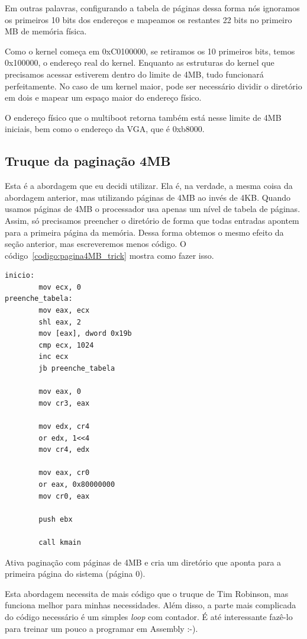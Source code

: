 \documentclass{article}
\begin{document}
Em outras palavras, configurando a tabela de páginas dessa forma nós ignoramos
os primeiros 10 bits dos endereços e mapeamos os restantes 22 bits no primeiro
MB de memória física.

Como o kernel começa em 0xC0100000, se retiramos os 10 primeiros bits, temos
0x100000, o endereço real do kernel. Enquanto as estruturas do kernel que
precisamos acessar estiverem dentro do limite de 4MB, tudo funcionará
perfeitamente. No caso de um kernel maior, pode ser necessário dividir o
diretório em dois e mapear um espaço maior do endereço físico.

O endereço físico que o multiboot retorna também está nesse limite de 4MB
iniciais, bem como o endereço da VGA, que é 0xb8000.

\subsection{Truque da paginação 4MB}
\label{subsec:paginacao_4MB}
Esta é a abordagem que eu decidi utilizar. Ela é, na verdade, a mesma coisa da
abordagem anterior, mas utilizando páginas de 4MB ao invés de 4KB. Quando usamos
páginas de 4MB o processador usa apenas um nível de tabela de páginas. Assim, só
precisamos preencher o diretório de forma que todas entradas apontem para a
primeira página da memória. Dessa forma obtemos o mesmo efeito da seção
anterior, mas escreveremos menos código. O código~\ref{codigo:pagina4MB_trick}
mostra como fazer isso.

\begin{codigo}
\begin{verbatim}
inicio:
        mov ecx, 0
preenche_tabela:
        mov eax, ecx
        shl eax, 2
        mov [eax], dword 0x19b
        cmp ecx, 1024
        inc ecx
        jb preenche_tabela

        mov eax, 0
        mov cr3, eax

        mov edx, cr4
        or edx, 1<<4
        mov cr4, edx

        mov eax, cr0
        or eax, 0x80000000
        mov cr0, eax

        push ebx 

        call kmain
\end{verbatim}
\caption{Ativa paginação com páginas de 4MB e cria um diretório que aponta para
a primeira página do sistema (página 0).}
\label{codigo:pagina4MB_trick}
\end{codigo}

Esta abordagem necessita de mais código que o truque de Tim Robinson, mas
funciona melhor para minhas necessidades. Além disso, a parte mais complicada do
código necessário é um simples \emph{loop} com contador. É até interessante
fazê-lo para treinar um pouco a programar em Assembly :-).
\end{document}
